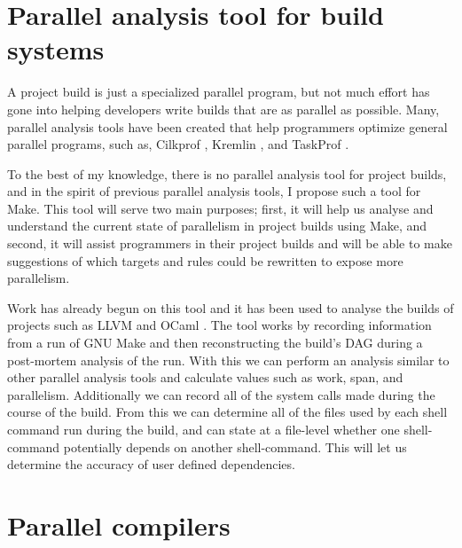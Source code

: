 \documentclass[10pt]{article}
\begin{document}
\section{Parallel analysis tool for build systems}
\label{sec:build}

A project build is just a specialized parallel program, but not much effort has gone
into helping developers write builds that are as parallel as possible.  Many, parallel
analysis tools have been created that help programmers optimize general parallel programs,
such as, Cilkprof \cite{schardl2015cilkprof}, Kremlin \cite{garcia2011kremlin}, and TaskProf
\cite{yoga2017fast}.

To the best of my knowledge, there is no parallel analysis tool for project builds, and in the
spirit of previous parallel analysis tools, I propose such a tool for Make.  This tool will
serve two main purposes; first, it will help us analyse and understand the current state of
parallelism in project builds using Make, and second, it will assist programmers in their project
builds and will be able to make suggestions of which targets and rules could be rewritten to
expose more parallelism.

Work has already begun on this tool and it has been used to analyse the builds of
projects such as LLVM \cite{lattner2002llvm} and OCaml \cite{ocaml}.  The tool works by
recording information from a run of GNU Make and then reconstructing the build's DAG
during a post-mortem analysis of the run.  With this we can perform an analysis similar
to other parallel analysis tools and calculate values such as work, span, and
parallelism.
Additionally we can record all of the system calls made during the course of the build.
From this we can determine all of the files used by each shell command run during the build, and
can state at a file-level whether one shell-command potentially depends on another shell-command.
This will let us determine the accuracy of user defined dependencies.

\section{Parallel compilers}

\end{document}
